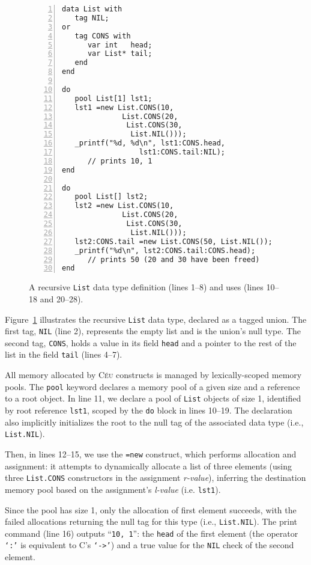 \documentclass{acm_proc_article-sp}
\newcommand{\CEU}{\textsc{C\'{e}u}\xspace}
\newcommand{\code}[1] {{\small{\texttt{#1}}}}
\begin{document}
\begin{figure}[t]
\begin{lstlisting}[numbers=left,xleftmargin=3em]
data List with
   tag NIL;
or
   tag CONS with
      var int   head;
      var List* tail;
   end
end

do
   pool List[1] lst1;
   lst1 =new List.CONS(10,
              List.CONS(20,
               List.CONS(30,
                List.NIL()));
   _printf("%d, %d\n", lst1:CONS.head,
                  lst1:CONS.tail:NIL);
      // prints 10, 1
end

do
   pool List[] lst2;
   lst2 =new List.CONS(10,
              List.CONS(20,
               List.CONS(30,
                List.NIL()));
   lst2:CONS.tail =new List.CONS(50, List.NIL());
   _printf("%d\n", lst2:CONS.tail:CONS.head);
      // prints 50 (20 and 30 have been freed)
end
\end{lstlisting}
\caption{
A recursive \code{List} data type definition (lines 1--8) and uses (lines 
10--18 and 20--28).
\label{lst.data.list}
}
\end{figure}

Figure~\ref{lst.data.list} illustrates the recursive \code{List} data type,
declared as a tagged union. The first tag, \code{NIL} (line 2), represents
the empty list and is the union's null type. The second tag, \code{CONS},
holds a value in its field \code{head} and a pointer to the rest of the list
in the field \code{tail} (lines 4--7).

All memory allocated by \CEU constructs is managed by lexically-scoped memory
pools. The \code{pool} keyword declares a memory pool of a given size and
a reference to a root object. In line 11, we declare a pool of \code{List}
objects of size 1, identified by root reference \code{lst1},
scoped by the \code{do} block in lines 10--19.
The declaration also implicitly initializes the root to the null tag of the 
associated data type (i.e., \code{List.NIL}).

Then, in lines 12--15, we use the \code{=new} construct, which performs
allocation and assignment: it attempts to dynamically allocate a list of
three elements (using three \code{List.CONS} constructors in the assignment
\emph{r-value}), inferring the destination memory pool based on the 
assignment's \emph{l-value} (i.e. \code{lst1}).

Since the pool has size 1, only the allocation of first element succeeds, with the failed 
allocations returning the null tag for this type (i.e., \code{List.NIL}).
The print command (line 16) outputs ``\texttt{10, 1}'': the \code{head} of the 
first element (the operator \code{`:'} is equivalent to C's \code{`->'}) and 
a true value for the \code{NIL} check of the second element.
\end{document}
